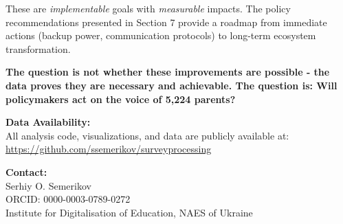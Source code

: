 \documentclass[11pt,a4paper]{article}
\begin{document}
These are \textit{implementable} goals with \textit{measurable} impacts. The policy recommendations presented in Section 7 provide a roadmap from immediate actions (backup power, communication protocols) to long-term ecosystem transformation.

\vspace{0.5cm}

\textbf{The question is not whether these improvements are possible - the data proves they are necessary and achievable. The question is: Will policymakers act on the voice of 5,224 parents?}

\vspace{1cm}

\noindent\textbf{Data Availability:}\\
All analysis code, visualizations, and data are publicly available at:\\
\url{https://github.com/ssemerikov/surveyprocessing}

\noindent\textbf{Contact:}\\
Serhiy O. Semerikov\\
ORCID: 0000-0003-0789-0272\\
Institute for Digitalisation of Education, NAES of Ukraine
\end{document}
